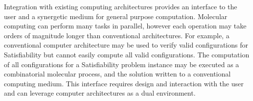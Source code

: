 Integration with existing computing architectures provides an interface to the user and a synergetic medium for general purpose computation.  Molecular computing can perform many tasks in parallel, however each operation may take orders of magnitude longer than conventional architectures.  For example, a conventional computer architecture may be used to verify valid configurations for {\sc Satisfiability} but cannot easily compute all valid configurations.  The computation of all configurations for a {\sc Satisfiability} problem instance may be executed as a combinatorial molecular process, and the solution written to a conventional computing medium.  This interface requires design and interaction with the user and can leverage computer architectures as a dual environment.   
